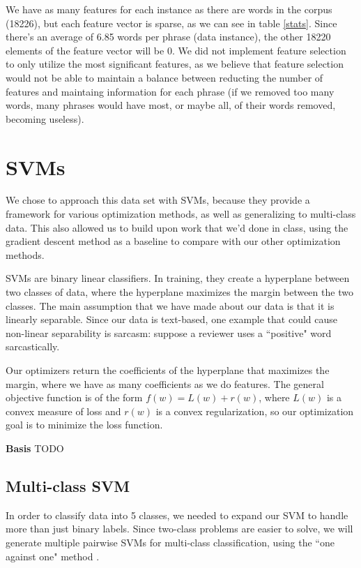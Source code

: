 \documentclass[letterpaper, 11pt]{article}
\begin{document}
We have as many features for each instance as there are words in the corpus (18226), but each feature vector is sparse, as we can see in table \ref{stats}.  Since there's an average of 6.85 words per phrase (data instance), the other 18220 elements of the feature vector will be 0.  We did not implement feature selection to only utilize the most significant features, as we believe that feature selection would not be able to maintain a balance between reducting the number of features and maintaing information for each phrase (if we removed too many words, many phrases would have most, or maybe all, of their words removed, becoming useless).

\section{SVMs}
We chose to approach this data set with SVMs, because they provide a framework for various optimization methods, as well as generalizing to multi-class data.  This also allowed us to build upon work that we'd done in class, using the gradient descent method as a baseline to compare with our other optimization methods.

SVMs are binary linear classifiers.  In training, they create a hyperplane between two classes of data, where the hyperplane maximizes the margin between the two classes.  The main assumption that we have made about our data is that it is linearly separable.  Since our data is text-based, one example that could cause non-linear separability is sarcasm: suppose a reviewer uses a ``positive" word sarcastically.

Our optimizers return the coefficients of the hyperplane that maximizes the margin, where we have as many coefficients as we do features.  The general objective function is of the form $f(w) = L(w) + r(w) $, where $L(w)$ is a convex measure of loss and $r(w)$ is a convex regularization, so our optimization goal is to minimize the loss function.

\textbf{Basis} TODO

\subsection{Multi-class SVM}
In order to classify data into 5 classes, we needed to expand our SVM to handle more than just binary labels.  Since two-class problems are easier to solve, we will generate multiple pairwise SVMs for multi-class classification, using the ``one against one" method \cite{milgram2006one}.
\end{document}
